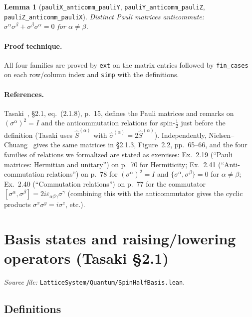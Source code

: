 \documentclass[a4paper,11pt]{article}
\newtheorem{lemma}[theorem]{Lemma}
\begin{document}
\begin{lemma}[\texttt{pauliX\_anticomm\_pauliY},
\texttt{pauliY\_anticomm\_pauliZ}, \texttt{pauliZ\_anticomm\_pauliX}]
Distinct Pauli matrices anticommute:
$\sigma^\alpha \sigma^\beta + \sigma^\beta \sigma^\alpha = 0$
for $\alpha \neq \beta$.
\end{lemma}

\paragraph{Proof technique.}
All four families are proved by \texttt{ext} on the matrix entries
followed by \texttt{fin\_cases} on each row/column index and
\texttt{simp} with the definitions.

\paragraph{References.}
Tasaki~\cite{Tasaki:QMB}, §2.1, eq.~(2.1.8), p.~15, defines the Pauli
matrices and remarks on $(\sigma^\alpha)^2 = I$ and the anticommutation
relations for spin-$\tfrac{1}{2}$ just before the definition (Tasaki
uses $\hat S^{(\alpha)}$ with
$\hat\sigma^{(\alpha)} = 2\hat S^{(\alpha)}$).
Independently, Nielsen--Chuang~\cite{NielsenChuang} gives the same
matrices in §2.1.3, Figure~2.2, pp.~65--66, and the four families of
relations we formalized are stated as exercises:
Ex.~2.19 (``Pauli matrices: Hermitian and unitary'') on p.~70 for
Hermiticity; Ex.~2.41 (``Anti-commutation relations'') on p.~78 for
$(\sigma^\alpha)^2 = I$ and $\{\sigma^\alpha, \sigma^\beta\} = 0$ for
$\alpha\neq\beta$; Ex.~2.40 (``Commutation relations'') on p.~77 for the
commutator $[\sigma^\alpha, \sigma^\beta] = 2i\varepsilon_{\alpha\beta\gamma}
\sigma^\gamma$ (combining this with the anticommutator gives the cyclic
products $\sigma^x\sigma^y = i\sigma^z$, etc.).

\section{Basis states and raising/lowering operators (Tasaki §2.1)}
\label{sec:spinhalfbasis}

\emph{Source file:} \texttt{LatticeSystem/Quantum/SpinHalfBasis.lean}.

\subsection{Definitions}
\end{document}
